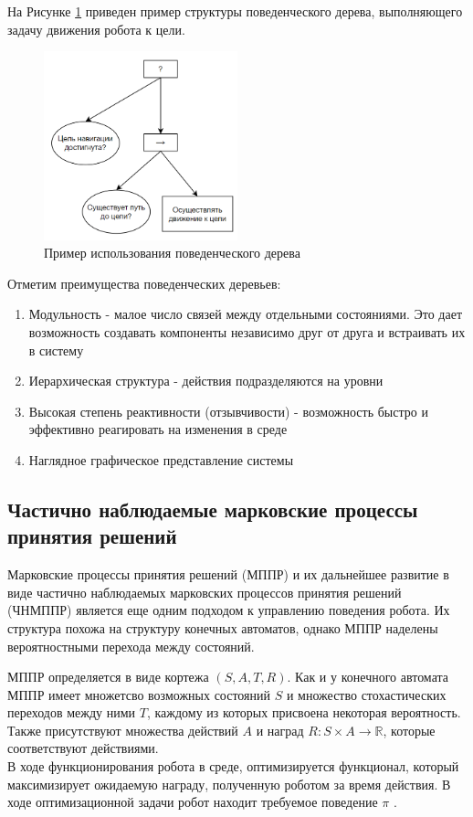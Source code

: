 На Рисунке \ref*{fig:bt_example} приведен пример структуры поведенческого дерева, выполняющего задачу движения робота к цели. 

\begin{figure}[h]
    \centering
    \includegraphics[width=0.5\textwidth]{images/chap_1/bt_example.png}
    \caption{Пример использования поведенческого дерева}
    \label{fig:bt_example}
\end{figure}

Отметим преимущества поведенческих деревьев:
\begin{enumerate}
    \item Модульность - малое число связей между отдельными состояниями. Это дает возможность создавать компоненты независимо друг от друга и встраивать их в систему
    \item Иерархическая структура - действия подразделяются на уровни
    \item Высокая степень реактивности (отзывчивости) - возможность быстро и эффективно реагировать на изменения в среде
    \item Наглядное графическое представление системы
\end{enumerate}

\subsection{Частично наблюдаемые марковские процессы принятия решений}
Марковские процессы принятия решений (МППР) и их дальнейшее развитие в виде частично наблюдаемых марковских процессов принятия решений (ЧНМППР) является еще одним подходом к управлению поведения робота. Их структура похожа на структуру конечных автоматов, однако МППР наделены вероятностными перехода между состояний. 

МППР определяется в виде кортежа $(S, A, T, R)$. Как и у конечного автомата МППР имеет множетсво возможных состояний $S$ и множество стохастических переходов между ними $T$, каждому из которых присвоена некоторая вероятность. Также присутствуют множества действий $A$ и наград $R: S \times A \rightarrow \mathbb{R}$, которые соответствуют действиями. \\
В ходе функционирования робота в среде, оптимизируется функционал, который максимизирует ожидаемую награду, полученную роботом за время действия. В ходе оптимизационной задачи робот находит требуемое поведение $\pi$ \cite{van2012reinforcement}.


